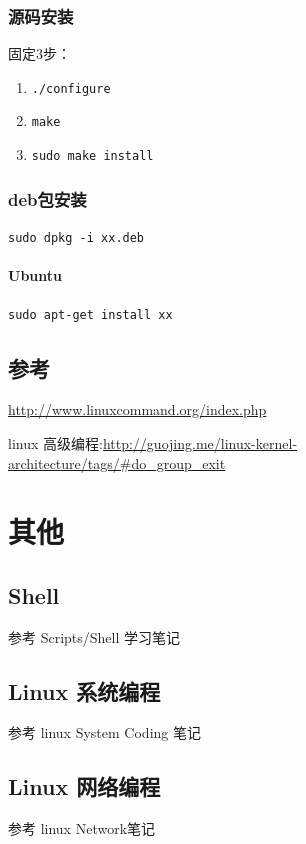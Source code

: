 \documentclass[UTF8,a4paper,12pt]{ctexbook}
\begin{document}
		\subsection{源码安装}
			固定3步：
			
			\begin{enumerate}
				\item \verb|./configure|
				\item \verb|make|
				\item \verb|sudo make install|
			\end{enumerate}
	
		\subsection{deb包安装}
			\verb|sudo dpkg -i xx.deb|
			
			\subsubsection{Ubuntu} \verb|sudo apt-get install xx|
			
	\section{参考}
		\url{http://www.linuxcommand.org/index.php}
		
		linux 高级编程:\url{http://guojing.me/linux-kernel-architecture/tags/#do_group_exit}
			


\chapter{其他}

	\section{Shell} 参考 Scripts/Shell 学习笔记	
	
	\section{Linux 系统编程} 参考 linux System Coding 笔记
	
	\section{Linux 网络编程} 参考 linux Network笔记
		
\end{document}
